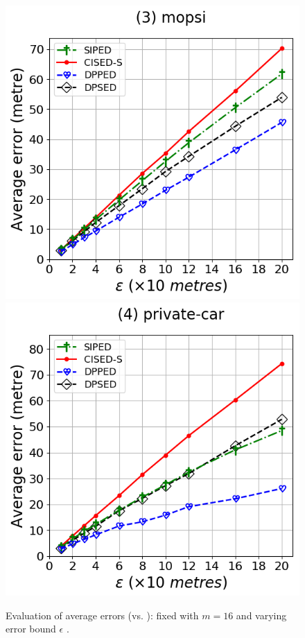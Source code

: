 {\begin{figure}[tb]
	\includegraphics[scale = 0.2900]{Figures/Exp-error-epsilon-ped-mopsi.png}\hspace{1ex}
	\includegraphics[scale = 0.2900]{Figures/Exp-error-epsilon-ped-private.png}
	\caption{\small Evaluation of average errors (\ped vs. \sed): fixed with $m=16$ and varying
    error bound $\epsilon$ .}
	\label{fig:ae-ped}
\end{figure}


}
